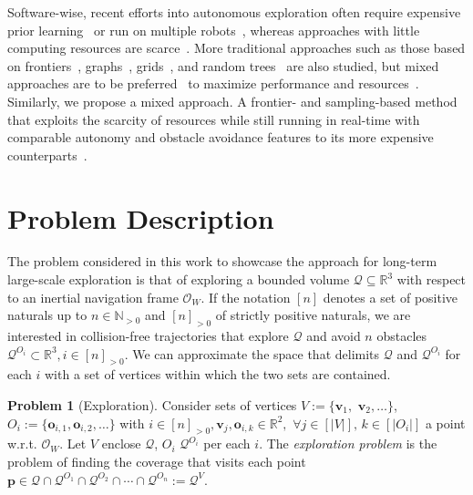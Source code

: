 \documentclass[lettersize,journal]{IEEEtran}
\theoremstyle{definition}
\newtheorem*{pb}{Problem}%
\begin{document}
Software-wise, recent efforts into autonomous exploration often require expensive prior learning~\cite{shrestha2019learned} or run on multiple robots~\cite{kulkarni2022autonomous,tranzatto2022cerberus,roucek2020darpa}, whereas %
approaches with little computing resources are scarce~\cite{bircher2016receding,batinovic2021multi,faisal2021low,muller2021openbot}. More traditional approaches such as those based on frontiers~\cite{kim2022autonomous,roucek2020darpa,batinovic2021multi}, graphs~\cite{kulkarni2022autonomous,tranzatto2022cerberus,dang2019graph}, grids~\cite{corah2019communication,tabib2022autonomous}, and random trees~\cite{papachristos2017uncertainty} are also studied, but mixed approaches are to be preferred~\cite{kohlbrecher2014hector,mei2006energy,shrestha2019learned,bircher2016receding,surmann2003autonomous,wenchuan2019sampling,dai2020fast} to maximize performance and resources~\cite{placed2022survey,bircher2016receding}.
%
Similarly, we propose a mixed approach. A frontier- and sampling-based method that exploits the scarcity of resources while still running in real-time with comparable autonomy and obstacle avoidance features to its more expensive counterparts~\cite{schmid2020efficient,kulkarni2022autonomous,muller2021openbot,tranzatto2022cerberus,roucek2020darpa,surmann2003autonomous}.%


\section{Problem Description}
\label{sec:pf}

The problem considered in this work to showcase the approach for long-term large-scale exploration is that of exploring a bounded volume $\mathcal{Q}\subseteq\mathbb{R}^3$ with respect to an inertial navigation frame $\mathcal{O}_W$. If the notation $[n]$ denotes a set of positive naturals up to $n\in\mathbb{N}_{>0}$ and $[n]_{>0}$ of strictly positive naturals, we are interested in collision-free trajectories that explore $\mathcal{Q}$ and avoid $n$ obstacles $\mathcal{Q}^{O_i}\subset\mathbb{R}^3,i\in[n]_{>0}$. We can approximate the space that delimits $\mathcal{Q}$ and $\mathcal{Q}^{O_i}$ for each $i$ with a set of vertices within which the two sets are contained.

\begin{pb}[Exploration]
  Consider sets of vertices $V:=\{\mathbf{v}_1,$ $\mathbf{v}_2,\dots\}$, $O_i:=\{\mathbf{o}_{i,1},\mathbf{o}_{i,2},\dots\}$ with $i\in[n]_{>0},\mathbf{v}_j,\mathbf{o}_{i,k}\in\mathbb{R}^2,$ $\forall j\in[|V|],\,k\in[|O_i|]$ a point w.r.t. $\mathcal{O}_W$. Let $V$ enclose $\mathcal{Q}$, $O_i$ $\mathcal{Q}^{O_i}$ per each $i$. The \textit{exploration problem} is the problem of finding the coverage that visits each point $\mathbf{p}\in\mathcal{Q}\cap\mathcal{Q}^{O_1}\cap\mathcal{Q}^{O_2}\cap\cdots\cap\mathcal{Q}^{O_n}:=\mathcal{Q}^V$.
\end{pb}
\end{document}

